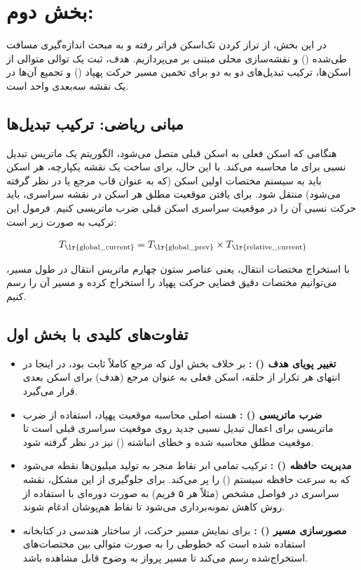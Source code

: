\documentclass[12pt,a4paper]{article}
\begin{document}
\section{بخش دوم: }

در این بخش، از تراز کردن تک‌اسکن فراتر رفته و به مبحث اندازه‌گیری مسافت طی‌شده () و نقشه‌سازی محلی مبتنی بر  می‌پردازیم. هدف، ثبت یک توالی متوالی از اسکن‌ها، ترکیب تبدیل‌های دو به دو برای تخمین مسیر حرکت پهپاد () و تجمیع آن‌ها در یک نقشه سه‌بعدی واحد است.

\subsection{مبانی ریاضی: ترکیب تبدیل‌ها }
هنگامی که اسکن فعلی به اسکن قبلی متصل می‌شود، الگوریتم  یک ماتریس تبدیل نسبی برای ما محاسبه می‌کند. با این حال، برای ساخت یک نقشه یکپارچه، هر اسکن باید به سیستم مختصات اولین اسکن (که به عنوان قاب مرجع یا  در نظر گرفته می‌شود) منتقل شود. برای یافتن موقعیت مطلق هر اسکن در نقشه سراسری، باید حرکت نسبی آن را در موقعیت سراسری اسکن قبلی ضرب ماتریسی کنیم. فرمول این ترکیب به صورت زیر است:

$$T_{\text{\lr{global\_current}}}=T_{\text{\lr{global\_prev}}}\times T_{\text{\lr{relative\_current}}}$$

با استخراج مختصات انتقال، یعنی عناصر ستون چهارم ماتریس انتقال در طول مسیر، می‌توانیم مختصات دقیق فضایی حرکت پهپاد را استخراج کرده و مسیر آن را رسم کنیم.

\subsection{تفاوت‌های کلیدی با بخش اول}
\begin{itemize}
	\item \textbf{تغییر پویای هدف () :} بر خلاف بخش اول که مرجع کاملاً ثابت بود، در اینجا در انتهای هر تکرار از حلقه، اسکن فعلی به عنوان مرجع (هدف) برای اسکن بعدی قرار می‌گیرد.
	\item \textbf{ضرب ماتریسی () :} هسته اصلی محاسبه موقعیت پهپاد، استفاده از ضرب ماتریسی برای اعمال تبدیل نسبی جدید روی موقعیت سراسری قبلی است تا موقعیت مطلق محاسبه شده و خطای انباشته () نیز در نظر گرفته شود.
	\item \textbf{مدیریت حافظه () :} ترکیب تمامی ابر نقاط منجر به تولید میلیون‌ها نقطه می‌شود که به سرعت حافظه سیستم () را پر می‌کند. برای جلوگیری از این مشکل، نقشه سراسری در فواصل مشخص (مثلاً هر ۵ فریم) به صورت دوره‌ای با استفاده از روش  کاهش نمونه‌برداری می‌شود تا نقاط هم‌پوشان ادغام شوند.
	\item \textbf{مصورسازی مسیر () :} برای نمایش مسیر حرکت، از ساختار هندسی  در کتابخانه  استفاده شده است که خطوطی را به صورت متوالی بین مختصات‌های استخراج‌شده رسم می‌کند تا مسیر پرواز به وضوح قابل مشاهده باشد.
\end{itemize}
\end{document}
